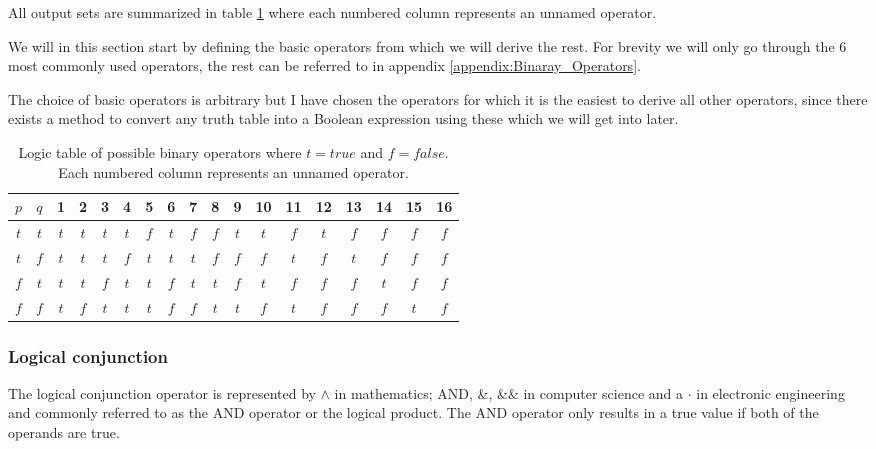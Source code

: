             All output sets are summarized in table \ref{LogicTable:PossibleOperators} where each numbered column represents an unnamed operator. 
            
            We will in this section start by defining the basic operators from which we will derive the rest. For brevity we will only go through the 6 most commonly used operators, the rest can be referred to in appendix \ref{appendix:Binaray_Operators}.  
            
            The choice of basic operators is arbitrary but I have chosen the operators for which it is the easiest to derive all other operators, since there exists a method to convert any truth table into a Boolean expression using these which we will get into later.
             
            
            \begin{table}[h!]
                \centering
                \begin{tabular}{|c|c||c|c|c|c|c|c|c|c|c|c|c|c|c|c|c|c|}
                	\hline
                	$p$ & $q$ &  1  &  2  &  3  &  4  &  5  &  6  &  7  &  8  &  9  & 10  & 11  & 12  & 13  & 14  & 15  & 16  \\ \hline
                	$t$ & $t$ & $t$ & $t$ & $t$ & $t$ & $f$ & $t$ & $f$ & $f$ & $t$ & $t$ & $f$ & $t$ & $f$ & $f$ & $f$ & $f$ \\ \hline
                	$t$ & $f$ & $t$ & $t$ & $t$ & $f$ & $t$ & $t$ & $t$ & $f$ & $f$ & $f$ & $t$ & $f$ & $t$ & $f$ & $f$ & $f$ \\ \hline
                	$f$ & $t$ & $t$ & $t$ & $f$ & $t$ & $t$ & $f$ & $t$ & $t$ & $f$ & $t$ & $f$ & $f$ & $f$ & $t$ & $f$ & $f$ \\ \hline
                	$f$ & $f$ & $t$ & $f$ & $t$ & $t$ & $t$ & $f$ & $f$ & $t$ & $t$ & $f$ & $t$ & $f$ & $f$ & $f$ & $t$ & $f$ \\ \hline
                \end{tabular} 
                \caption{Logic table of possible binary operators where $t=true$ and $f=false$. Each numbered column represents an unnamed operator.}
                \label{LogicTable:PossibleOperators}
            \end{table}
        
            \subsubsection{Logical conjunction}
        
                The logical conjunction operator is represented by $\wedge$ in mathematics; AND, \&, \&\& in computer science and a $\cdot$ in electronic engineering and commonly referred to as the AND operator or the logical product. The AND operator only results in a true value if both of the operands are true.
                
